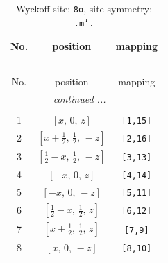 \documentclass[fleqn,8pt]{jsarticle}
\begin{document}
\begin{longtable}{ccc}
\caption{Wyckoff site: {\tt 8o}, site symmetry: {\tt .m'.}}
 \\
 \hline \hline
No. & position & mapping \\ \hline \endfirsthead

\multicolumn{2}{l}{\tablename\ \thetable{}} \\
 \hline \hline
No. & position & mapping \\ \hline \endhead

 \hline \hline
\multicolumn{2}{r}{\footnotesize\it continued ...} \\ \endfoot

 \hline \hline
\multicolumn{2}{r}{} \\ \endlastfoot

1 & $\left[ x,\, 0,\, z \right]$ & {\tt [1,15]} \\ \hline
2 & $\left[ x + \frac{1}{2},\, \frac{1}{2},\, - z \right]$ & {\tt [2,16]} \\ \hline
3 & $\left[ \frac{1}{2} - x,\, \frac{1}{2},\, - z \right]$ & {\tt [3,13]} \\ \hline
4 & $\left[ - x,\, 0,\, z \right]$ & {\tt [4,14]} \\ \hline
5 & $\left[ - x,\, 0,\, - z \right]$ & {\tt [5,11]} \\ \hline
6 & $\left[ \frac{1}{2} - x,\, \frac{1}{2},\, z \right]$ & {\tt [6,12]} \\ \hline
7 & $\left[ x + \frac{1}{2},\, \frac{1}{2},\, z \right]$ & {\tt [7,9]} \\ \hline
8 & $\left[ x,\, 0,\, - z \right]$ & {\tt [8,10]} \\
\end{longtable}
\renewcommand{\arraystretch}{1.2}
\end{document}
